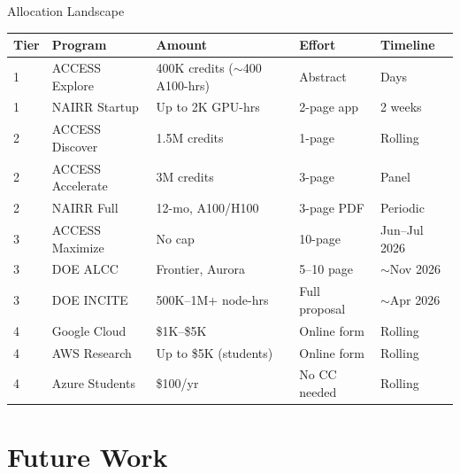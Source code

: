 \documentclass[10pt, aspectratio=169]{beamer}
\begin{document}
\begin{frame}{Allocation Landscape}
  \begin{table}
    \centering
    \footnotesize
    \begin{tabular}{llp{4.5cm}ll}
      \toprule
      \textbf{Tier} & \textbf{Program} & \textbf{Amount} & \textbf{Effort} & \textbf{Timeline} \\
      \midrule
      1 & ACCESS Explore   & 400K credits ($\sim$400 A100-hrs) & Abstract     & Days \\
      1 & NAIRR Startup    & Up to 2K GPU-hrs                   & 2-page app   & 2 weeks \\
      \midrule
      2 & ACCESS Discover  & 1.5M credits                       & 1-page       & Rolling \\
      2 & ACCESS Accelerate & 3M credits                        & 3-page       & Panel \\
      2 & NAIRR Full       & 12-mo, A100/H100                   & 3-page PDF   & Periodic \\
      \midrule
      3 & ACCESS Maximize  & No cap                             & 10-page      & Jun--Jul 2026 \\
      3 & DOE ALCC         & Frontier, Aurora                   & 5--10 page   & $\sim$Nov 2026 \\
      3 & DOE INCITE       & 500K--1M+ node-hrs                 & Full proposal & $\sim$Apr 2026 \\
      \midrule
      4 & Google Cloud     & \$1K--\$5K                         & Online form  & Rolling \\
      4 & AWS Research     & Up to \$5K (students)              & Online form  & Rolling \\
      4 & Azure Students   & \$100/yr                           & No CC needed & Rolling \\
      \bottomrule
    \end{tabular}
  \end{table}
\end{frame}

\section{Future Work}
\end{document}
